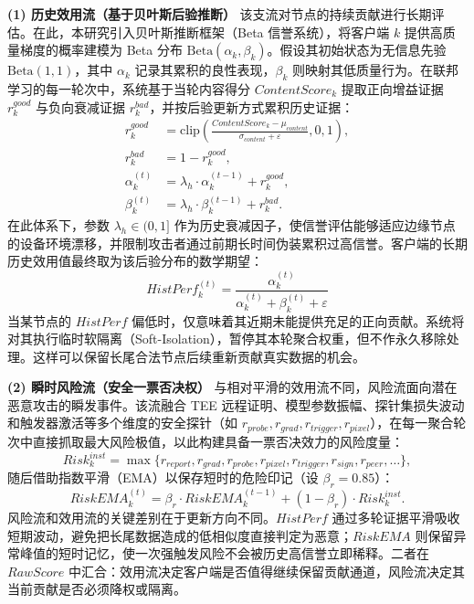\documentclass[11pt, a4paper, UTF8, fontset=fandol]{ctexart}
\begin{document}
\textbf{(1) 历史效用流（基于贝叶斯后验推断）}
该支流对节点的持续贡献进行长期评估。在此，本研究引入贝叶斯推断框架（Beta 信誉系统），将客户端 $k$ 提供高质量梯度的概率建模为 Beta 分布 $\text{Beta}(\alpha_k, \beta_k)$。假设其初始状态为无信息先验 $\text{Beta}(1,1)$，其中 $\alpha_k$ 记录其累积的良性表现，$\beta_k$ 则映射其低质量行为。在联邦学习的每一轮次中，系统基于当轮内容得分 $ContentScore_k$ 提取正向增益证据 $r_{k}^{good}$ 与负向衰减证据 $r_{k}^{bad}$，并按后验更新方式累积历史证据：
\begin{align}
    r_{k}^{good}     & = \mathrm{clip}\left(\frac{ContentScore_{k} - \mu_{content}}{\sigma_{content} + \varepsilon}, 0, 1\right), \\
    r_{k}^{bad}      & = 1 - r_{k}^{good},                                                                                        \\
    \alpha_{k}^{(t)} & = \lambda_h \cdot \alpha_{k}^{(t-1)} + r_{k}^{good},                                                       \\
    \beta_{k}^{(t)}  & = \lambda_h \cdot \beta_{k}^{(t-1)} + r_{k}^{bad}.
\end{align}
在此体系下，参数 $\lambda_h \in (0,1]$ 作为历史衰减因子，使信誉评估能够适应边缘节点的设备环境漂移，并限制攻击者通过前期长时间伪装累积过高信誉。客户端的长期历史效用值最终取为该后验分布的数学期望：
\begin{equation}
    HistPerf_{k}^{(t)} = \frac{\alpha_{k}^{(t)}}{\alpha_{k}^{(t)} + \beta_{k}^{(t)} + \varepsilon}
\end{equation}
当某节点的 $HistPerf$ 偏低时，仅意味着其近期未能提供充足的正向贡献。系统将对其执行临时软隔离（Soft-Isolation），暂停其本轮聚合权重，但不作永久移除处理。这样可以保留长尾合法节点后续重新贡献真实数据的机会。

\textbf{(2) 瞬时风险流（安全一票否决权）}
与相对平滑的效用流不同，风险流面向潜在恶意攻击的瞬发事件。该流融合 TEE 远程证明、模型参数振幅、探针集损失波动和触发器激活等多个维度的安全探针（如 $r_{probe}, r_{grad}, r_{trigger}, r_{pixel}$），在每一聚合轮次中直接抓取最大风险极值，以此构建具备一票否决效力的风险度量：
\begin{equation}
    Risk_{k}^{inst} = \max\{r_{report}, r_{grad}, r_{probe}, r_{pixel}, r_{trigger}, r_{sign}, r_{peer}, \dots \},
\end{equation}
随后借助指数平滑（EMA）以保存短时的危险印记（设 $\beta_r = 0.85$）：
\begin{equation}
    RiskEMA_{k}^{(t)} = \beta_{r} \cdot RiskEMA_{k}^{(t-1)} + (1 - \beta_{r}) \cdot Risk_{k}^{inst}.
\end{equation}
风险流和效用流的关键差别在于更新方向不同。$HistPerf$ 通过多轮证据平滑吸收短期波动，避免把长尾数据造成的低相似度直接判定为恶意；$RiskEMA$ 则保留异常峰值的短时记忆，使一次强触发风险不会被历史高信誉立即稀释。二者在 $RawScore$ 中汇合：效用流决定客户端是否值得继续保留贡献通道，风险流决定其当前贡献是否必须降权或隔离。
\end{document}
